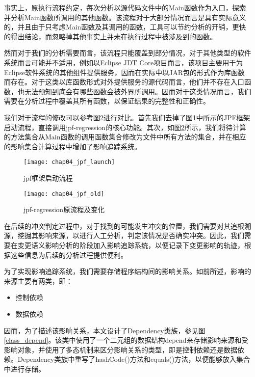事实上，原执行流程约定，每次分析以源代码文件中的Main函数作为入口，探索并分析Main函数所调用的其他函数。该流程对于大部分情况而言是具有实际意义的，并且由于只考虑Main函数及其调用的函数，工具可以节约分析的开销，更快的得出结论，而忽略掉其他事实上并未在执行过程中被涉及到的函数。

然而对于我们的分析需要而言，该流程只能覆盖到部分情况，对于其他类型的软件系统而言可能并不适用，例如以Eclipse JDT Core项目而言，该项目主要用于为Eclipse软件系统的其他组件提供服务，因而在实际中以JAR包的形式作为库函数而存在。对于这类以库函数形式对外提供服务的源代码而言，他们并不存在入口函数，也无法预知到底会有哪些函数会被外界所调用。因而对于这类情况而言，我们需要在分析过程中覆盖其所有函数，以保证结果的完整性和正确性。

我们对于流程的修改可以参考图\ref {impact_process_old}进行对比。首先我们去掉了图\ref {impact_process}中所示的JPF框架启动流程，直接调用jpf-regression的核心功能。其次，如图\ref {impact_process_old}所示，我们将待计算的方法集合从Main函数的调用函数集合修改为文件中所有方法的集合，并在相应的影响集合计算过程中增加了影响追踪系统。

\begin{figure}[H]
	\centering
	\texttt{[image: chap04\_jpf\_launch]}
	\caption {jpf框架启动流程}
	\label {impact_process}	
\end{figure}


\begin{figure}
	\centering
	\texttt{[image: chap04\_jpf\_old]}
	\caption {jpf-regression原流程及变化}
	\label {impact_process_old}	
\end{figure}



在后续的冲突判定过程中，对于找到的可能发生冲突的位置，我们需要对其追根溯源，挖掘其影响来源，以进行人工分析，判定该情况是否确实冲突。因此，我们需要在变更语义影响分析的阶段加入影响追踪系统，以便记录下变更影响的轨迹，根据这些信息为后续的分析过程提供便利。

为了实现影响追踪系统，我们需要存储程序结构间的影响关系。如前所述，影响的来源主要有两类，即：
\begin{itemize}
	\item 控制依赖
	\item 数据依赖
\end{itemize}

因而，为了描述该影响关系，本文设计了Dependency类族，参见图\ref {class_depend}。该类中使用了一个二元组的数据结构depend来存储影响来源和受影响对象，并使用了多态机制来区分影响关系的类型，即是控制依赖还是数据依赖。Dependency类族中重写了hashCode()方法和equals()方法，以便能够放入集合中进行存储。

